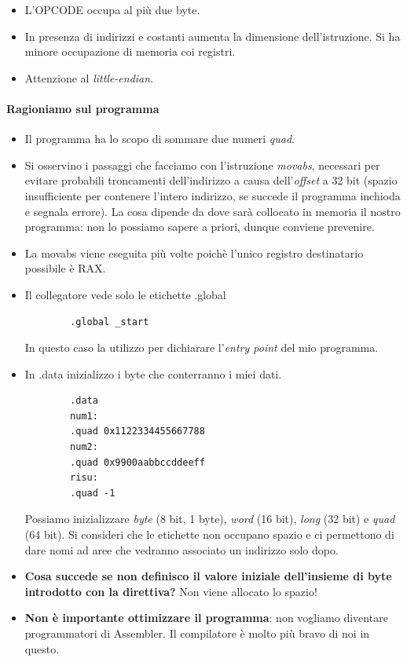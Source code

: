 \begin{itemize}
	\begin{itemize}
		\item L'OPCODE occupa al più due byte.
		\item In presenza di indirizzi e costanti aumenta la dimensione dell'istruzione. Si ha minore occupazione di memoria coi registri.
		\item Attenzione al \emph{little-endian}.
	\end{itemize}
\end{itemize}


\paragraph{Ragioniamo sul programma}
\begin{itemize}
	\item Il programma ha lo scopo di sommare due numeri \emph{quad}. 
	\item Si osservino i passaggi che facciamo con l'istruzione \emph{movabs}, necessari per evitare probabili troncamenti dell'indirizzo a causa dell'\emph{offset} a 32 bit (spazio insufficiente per contenere l'intero indirizzo, se succede il programma inchioda e segnala errore). La cosa dipende da dove sarà collocato in memoria il nostro programma: non lo possiamo sapere a priori, dunque conviene prevenire. 
	\item La movabs viene eseguita più volte poichè l'unico registro destinatario possibile è RAX.
	\item Il collegatore vede solo le etichette .global 
	\begin{verbatim}
		.global _start
	\end{verbatim}In questo caso la utilizzo per dichiarare l'\emph{entry point} del mio programma.
	\item In .data inizializzo i byte che conterranno i miei dati.  
	\begin{verbatim}
		.data
		num1:
		.quad 0x1122334455667788
		num2:
		.quad 0x9900aabbccddeeff
		risu:
		.quad -1
	\end{verbatim}
	Possiamo inizializzare \emph{byte} (8 bit, 1 byte), \emph{word} (16 bit), \emph{long} (32 bit) e \emph{quad} (64 bit). Si consideri che le etichette non occupano spazio e ci permettono di dare nomi ad aree che vedranno associato un indirizzo solo dopo. 
	\item \textbf{Cosa succede se non definisco il valore iniziale dell'insieme di byte introdotto con la direttiva?} Non viene allocato lo spazio! 
	\item \textbf{Non è importante ottimizzare il programma}: non vogliamo diventare programmatori di Assembler. Il compilatore è molto più bravo di noi in questo.
	

\end{itemize}
